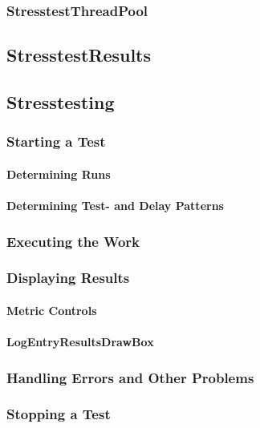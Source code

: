 \subsubsection{StresstestThreadPool}
\subsection{StresstestResults}
\subsection{Stresstesting}
\subsubsection{Starting a Test}
\paragraph{Determining Runs}
\paragraph{Determining Test- and Delay Patterns}
\subsubsection{Executing the Work}
\subsubsection{Displaying Results}
\paragraph{Metric Controls}
\paragraph{LogEntryResultsDrawBox}
\subsubsection{Handling Errors and Other Problems}
\subsubsection{Stopping a Test}